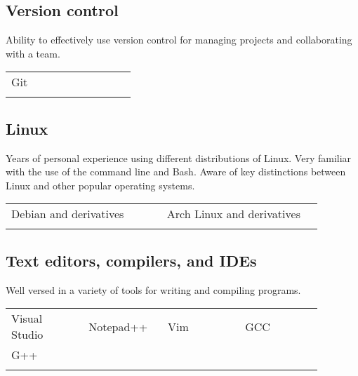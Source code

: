 \documentclass[letterpaper]{article}
\begin{document}
        \subsection*{Version control}
        Ability to effectively use version control for managing projects and collaborating with a team.

        \begin{center}
        \begin{tabular}{p{0.22\linewidth} p{0.22\linewidth} p{0.22\linewidth} p{0.22\linewidth}}
            \\
            Git &&&\\
            \\
        \end{tabular}
        \end{center}

        \subsection*{Linux}

        Years of personal experience using different distributions of Linux.
        Very familiar with the use of the command line and Bash.
        Aware of key distinctions between Linux and other popular operating systems.

        \begin{center}
        \begin{tabular}{p{0.44\linewidth} p{0.44\linewidth}}
            \\
            Debian and derivatives & Arch Linux and derivatives \\
            \\
        \end{tabular}
        \end{center}

        \subsection*{Text editors, compilers, and IDEs}
        Well versed in a variety of tools for writing and compiling programs.

        \begin{center}
        \begin{tabular}{p{0.22\linewidth} p{0.22\linewidth} p{0.22\linewidth} p{0.22\linewidth}}
            \\
            Visual Studio & Notepad++ & Vim & GCC \\
            G++ &&&\\
            \\
        \end{tabular}
        \end{center}
\end{document}
